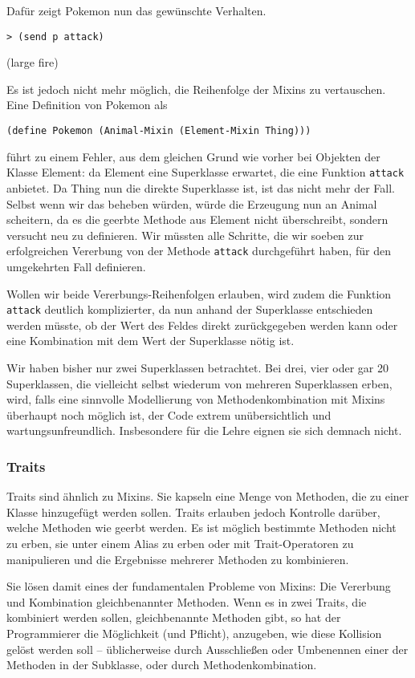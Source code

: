 Dafür zeigt Pokemon nun das gewünschte Verhalten.
\begin{lstlisting}
> (send p attack)
\end{lstlisting}
{\rsymbol (large fire)}

Es ist jedoch nicht mehr möglich, die Reihenfolge der Mixins zu vertauschen. Eine Definition von Pokemon als

\begin{lstlisting}
(define Pokemon (Animal-Mixin (Element-Mixin Thing)))
\end{lstlisting}

führt zu einem Fehler, aus dem gleichen Grund wie vorher bei Objekten der Klasse Element: da Element eine Superklasse erwartet, die eine Funktion \texttt{attack} anbietet. Da Thing nun die direkte Superklasse ist, ist das nicht mehr der Fall. Selbst wenn wir das beheben würden, würde die Erzeugung nun an Animal scheitern, da es die geerbte Methode aus Element nicht überschreibt, sondern versucht neu zu definieren. Wir müssten alle Schritte, die wir soeben zur erfolgreichen Vererbung von der Methode \texttt{attack} durchgeführt haben, für den umgekehrten Fall definieren. 

Wollen wir beide Vererbungs-Reihenfolgen erlauben, wird zudem die Funktion \texttt{attack} deutlich komplizierter, da nun anhand der Superklasse entschieden werden müsste, ob der Wert des Feldes direkt zurückgegeben werden kann oder eine Kombination mit dem Wert der Superklasse nötig ist.

Wir haben bisher nur zwei Superklassen betrachtet. Bei drei, vier oder gar 20 Superklassen, die vielleicht selbst wiederum von mehreren Superklassen erben, wird, falls eine sinnvolle Modellierung von Methodenkombination mit Mixins überhaupt noch möglich ist, der Code extrem unübersichtlich und wartungsunfreundlich. Insbesondere für die Lehre eignen sie sich demnach nicht.

\subsubsection{Traits}
Traits sind ähnlich zu Mixins. Sie kapseln eine Menge von Methoden, die zu einer Klasse hinzugefügt werden sollen. Traits erlauben jedoch Kontrolle darüber, welche Methoden wie geerbt werden. Es ist möglich bestimmte Methoden nicht zu erben, sie unter einem Alias zu erben oder mit Trait-Operatoren zu manipulieren und die Ergebnisse mehrerer Methoden zu kombinieren.

Sie lösen damit eines der fundamentalen Probleme von Mixins: Die Vererbung und Kombination gleichbenannter Methoden. Wenn es in zwei Traits, die kombiniert werden sollen, gleichbenannte Methoden gibt, so hat der Programmierer die Möglichkeit (und Pflicht), anzugeben, wie diese Kollision gelöst werden soll -- üblicherweise durch Ausschließen oder Umbenennen einer der Methoden in der Subklasse, oder durch Methodenkombination.

